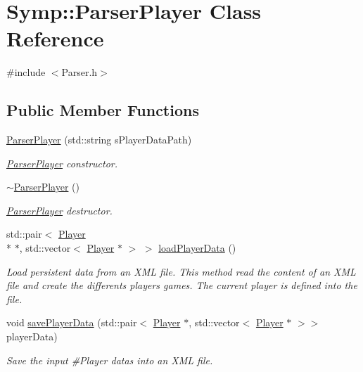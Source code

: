 \hypertarget{class_symp_1_1_parser_player}{\section{Symp\-:\-:Parser\-Player Class Reference}
\label{class_symp_1_1_parser_player}
}


{\ttfamily \#include $<$Parser.\-h$>$}

\subsection*{Public Member Functions}
\begin{DoxyCompactItemize}
\item 
\hyperlink{class_symp_1_1_parser_player_a03f3dfe4d73a8dadb71ae5fd034bc9bc}{Parser\-Player} (std\-::string s\-Player\-Data\-Path)
\begin{DoxyCompactList}\small\item\em \hyperlink{class_symp_1_1_parser_player_a03f3dfe4d73a8dadb71ae5fd034bc9bc}{Parser\-Player} constructor. \end{DoxyCompactList}\item 
\hyperlink{class_symp_1_1_parser_player_a418e3d0bbe4bb706b6d66aeb903fb9c1}{$\sim$\-Parser\-Player} ()
\begin{DoxyCompactList}\small\item\em \hyperlink{class_symp_1_1_parser_player_a03f3dfe4d73a8dadb71ae5fd034bc9bc}{Parser\-Player} destructor. \end{DoxyCompactList}\item 
std\-::pair$<$ \hyperlink{class_symp_1_1_player}{Player} \\*
$\ast$, std\-::vector$<$ \hyperlink{class_symp_1_1_player}{Player} $\ast$ $>$ $>$ \hyperlink{class_symp_1_1_parser_player_a5557f2a1924c72138e9a865e46e64d9a}{load\-Player\-Data} ()
\begin{DoxyCompactList}\small\item\em Load persistent data from an X\-M\-L file. This method read the content of an X\-M\-L file and create the differents players games. The current player is defined into the file. \end{DoxyCompactList}\item 
void \hyperlink{class_symp_1_1_parser_player_a5b631d7764c94970f29b3b5aaa20a55f}{save\-Player\-Data} (std\-::pair$<$ \hyperlink{class_symp_1_1_player}{Player} $\ast$, std\-::vector$<$ \hyperlink{class_symp_1_1_player}{Player} $\ast$ $>$$>$ player\-Data)
\begin{DoxyCompactList}\small\item\em Save the input \#\-Player datas into an X\-M\-L file. \end{DoxyCompactList}\end{DoxyCompactItemize}


